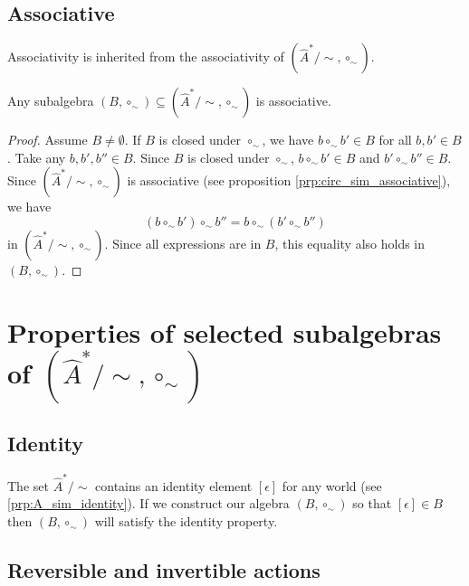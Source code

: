 \subsection{Associative}
Associativity is inherited from the associativity of $(\hat{A}^{*}/\sim, \circ_{\sim})$.
\begin{proposition}\label{prp:any_subalgebra_associative}
    Any subalgebra $(B, \circ_{\sim}) \subseteq (\hat{A}^{*}/\sim, \circ_{\sim})$ is associative.
\end{proposition}
\begin{proof}
    Assume $B \neq \emptyset$.
    If $B$ is closed under $\circ_{\sim}$, we have $b \circ_{\sim} b' \in B$ for all $b,b' \in B$.
    Take any $b, b', b'' \in B$.
    Since $B$ is closed under $\circ_{\sim}$, $b \circ_{\sim} b' \in B$ and $b' \circ_{\sim} b'' \in B$.
    Since $(\hat{A}^{*}/\sim, \circ_{\sim})$ is associative (see proposition \ref{prp:circ_sim_associative}), we have
    \begin{equation}
        (b \circ_{\sim} b') \circ_{\sim} b'' = b \circ_{\sim} (b' \circ_{\sim} b'')
    \end{equation}
    in $(\hat{A}^{*}/\sim, \circ_{\sim})$.
    Since all expressions are in $B$, this equality also holds in $(B, \circ_{\sim})$.
\end{proof}

\section{Properties of selected subalgebras of $(\hat{A}^{*}/\sim, \circ_{\sim})$}

\subsection{Identity}
The set $\hat{A}^{*}/\sim$ contains an identity element $[\epsilon]$ for any world (see \cref{prp:A_sim_identity}).
If we construct our algebra $(B, \circ_{\sim})$ so that $[\epsilon] \in B$ then $(B, \circ_{\sim})$ will satisfy the identity property.


\subsection{Reversible and invertible actions}
